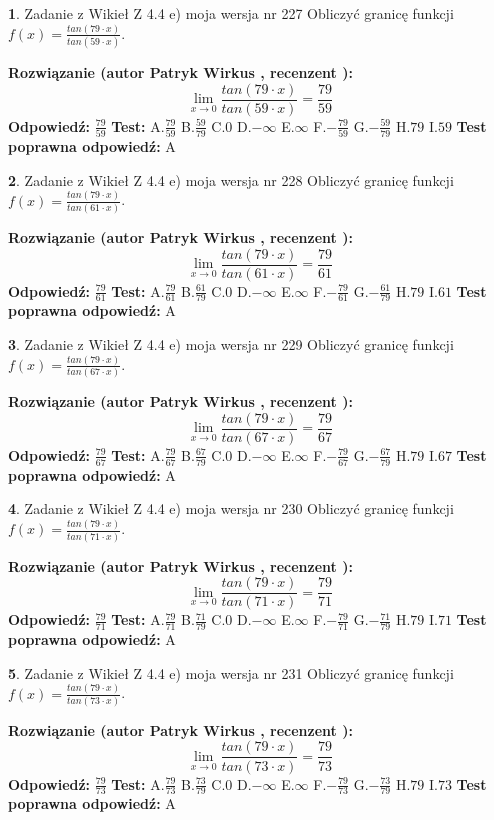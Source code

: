 \documentclass[12pt, a4paper]{article}
\theoremstyle{definition} %
\newtheorem{zad}{}
\newcommand{\zadStart}[1]{\begin{zad}#1\newline}
\newcommand{\zadStop}{\end{zad}}
\newcommand{\rozwStart}[2]{\noindent \textbf{Rozwiązanie (autor #1 , recenzent #2): }\newline}
\newcommand{\rozwStop}{\newline}
\newcommand{\odpStart}{\noindent \textbf{Odpowiedź:}\newline}
\newcommand{\odpStop}{\newline}
\newcommand{\testStart}{\noindent \textbf{Test:}\newline}
\newcommand{\testStop}{\newline}
\newcommand{\kluczStart}{\noindent \textbf{Test poprawna odpowiedź:}\newline}
\newcommand{\kluczStop}{\newline}
\begin{document}
\zadStart{Zadanie z Wikieł Z 4.4 e) moja wersja nr 227}
Obliczyć granicę funkcji $f(x)=\frac{tan(79\cdot x)}{tan(59\cdot x)}$.
\zadStop
\rozwStart{Patryk Wirkus}{}
$$\lim\limits_{x\to 0}\frac{tan(79\cdot x)}{tan(59\cdot x)}=
\frac{79}{59}$$
\rozwStop
\odpStart
$\frac{79}{59}$
\odpStop
\testStart
A.$\frac{79}{59}$
B.$\frac{59}{79}$
C.$0$
D.$-\infty$
E.$\infty$
F.$-\frac{79}{59}$
G.$-\frac{59}{79}$
H.$79$
I.$59$
\testStop
\kluczStart
A
\kluczStop



\zadStart{Zadanie z Wikieł Z 4.4 e) moja wersja nr 228}
Obliczyć granicę funkcji $f(x)=\frac{tan(79\cdot x)}{tan(61\cdot x)}$.
\zadStop
\rozwStart{Patryk Wirkus}{}
$$\lim\limits_{x\to 0}\frac{tan(79\cdot x)}{tan(61\cdot x)}=
\frac{79}{61}$$
\rozwStop
\odpStart
$\frac{79}{61}$
\odpStop
\testStart
A.$\frac{79}{61}$
B.$\frac{61}{79}$
C.$0$
D.$-\infty$
E.$\infty$
F.$-\frac{79}{61}$
G.$-\frac{61}{79}$
H.$79$
I.$61$
\testStop
\kluczStart
A
\kluczStop



\zadStart{Zadanie z Wikieł Z 4.4 e) moja wersja nr 229}
Obliczyć granicę funkcji $f(x)=\frac{tan(79\cdot x)}{tan(67\cdot x)}$.
\zadStop
\rozwStart{Patryk Wirkus}{}
$$\lim\limits_{x\to 0}\frac{tan(79\cdot x)}{tan(67\cdot x)}=
\frac{79}{67}$$
\rozwStop
\odpStart
$\frac{79}{67}$
\odpStop
\testStart
A.$\frac{79}{67}$
B.$\frac{67}{79}$
C.$0$
D.$-\infty$
E.$\infty$
F.$-\frac{79}{67}$
G.$-\frac{67}{79}$
H.$79$
I.$67$
\testStop
\kluczStart
A
\kluczStop



\zadStart{Zadanie z Wikieł Z 4.4 e) moja wersja nr 230}
Obliczyć granicę funkcji $f(x)=\frac{tan(79\cdot x)}{tan(71\cdot x)}$.
\zadStop
\rozwStart{Patryk Wirkus}{}
$$\lim\limits_{x\to 0}\frac{tan(79\cdot x)}{tan(71\cdot x)}=
\frac{79}{71}$$
\rozwStop
\odpStart
$\frac{79}{71}$
\odpStop
\testStart
A.$\frac{79}{71}$
B.$\frac{71}{79}$
C.$0$
D.$-\infty$
E.$\infty$
F.$-\frac{79}{71}$
G.$-\frac{71}{79}$
H.$79$
I.$71$
\testStop
\kluczStart
A
\kluczStop



\zadStart{Zadanie z Wikieł Z 4.4 e) moja wersja nr 231}
Obliczyć granicę funkcji $f(x)=\frac{tan(79\cdot x)}{tan(73\cdot x)}$.
\zadStop
\rozwStart{Patryk Wirkus}{}
$$\lim\limits_{x\to 0}\frac{tan(79\cdot x)}{tan(73\cdot x)}=
\frac{79}{73}$$
\rozwStop
\odpStart
$\frac{79}{73}$
\odpStop
\testStart
A.$\frac{79}{73}$
B.$\frac{73}{79}$
C.$0$
D.$-\infty$
E.$\infty$
F.$-\frac{79}{73}$
G.$-\frac{73}{79}$
H.$79$
I.$73$
\testStop
\kluczStart
A
\kluczStop
\end{document}
